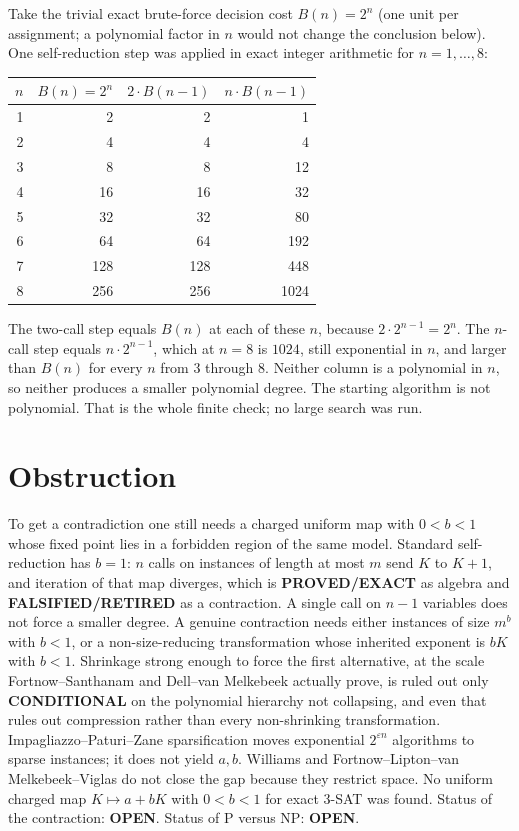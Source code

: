 \documentclass[11pt]{article}
\begin{document}
Take the trivial exact brute-force decision cost $B(n)=2^{n}$ (one unit per assignment; a polynomial factor in $n$ would not change the conclusion below). One self-reduction step was applied in exact integer arithmetic for $n=1,\ldots,8$:
\begin{center}
\begin{tabular}{rrrr}
$n$ & $B(n)=2^{n}$ & $2\cdot B(n-1)$ & $n\cdot B(n-1)$ \\
\hline
1 & 2 & 2 & 1 \\
2 & 4 & 4 & 4 \\
3 & 8 & 8 & 12 \\
4 & 16 & 16 & 32 \\
5 & 32 & 32 & 80 \\
6 & 64 & 64 & 192 \\
7 & 128 & 128 & 448 \\
8 & 256 & 256 & 1024 \\
\end{tabular}
\end{center}
The two-call step equals $B(n)$ at each of these $n$, because $2\cdot 2^{n-1}=2^{n}$. The $n$-call step equals $n\cdot 2^{n-1}$, which at $n=8$ is $1024$, still exponential in $n$, and larger than $B(n)$ for every $n$ from $3$ through $8$. Neither column is a polynomial in $n$, so neither produces a smaller polynomial degree. The starting algorithm is not polynomial. That is the whole finite check; no large search was run.

\section*{Obstruction}
To get a contradiction one still needs a charged uniform map with $0<b<1$ whose fixed point lies in a forbidden region of the same model. Standard self-reduction has $b=1$: $n$ calls on instances of length at most $m$ send $K$ to $K+1$, and iteration of that map diverges, which is \textbf{PROVED/EXACT} as algebra and \textbf{FALSIFIED/RETIRED} as a contraction. A single call on $n-1$ variables does not force a smaller degree. A genuine contraction needs either instances of size $m^{b}$ with $b<1$, or a non-size-reducing transformation whose inherited exponent is $bK$ with $b<1$. Shrinkage strong enough to force the first alternative, at the scale Fortnow--Santhanam and Dell--van Melkebeek actually prove, is ruled out only \textbf{CONDITIONAL} on the polynomial hierarchy not collapsing, and even that rules out compression rather than every non-shrinking transformation. Impagliazzo--Paturi--Zane sparsification moves exponential $2^{\varepsilon n}$ algorithms to sparse instances; it does not yield $a,b$. Williams and Fortnow--Lipton--van Melkebeek--Viglas do not close the gap because they restrict space. No uniform charged map $K\mapsto a+bK$ with $0<b<1$ for exact 3-SAT was found. Status of the contraction: \textbf{OPEN}. Status of P versus NP: \textbf{OPEN}.

\end{document}
